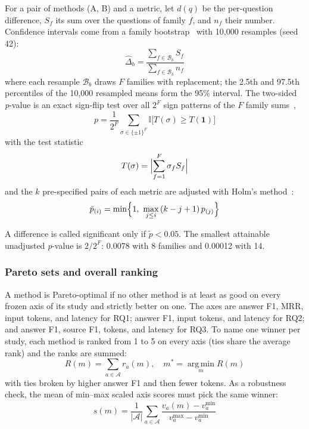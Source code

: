 \documentclass[conference]{IEEEtran}
\begin{document}
For a pair of methods (A, B) and a metric, let $d(q)$ be the per-question difference, $S_f$ its sum over the questions of family $f$, and $n_f$ their number. Confidence intervals come from a family bootstrap~\cite{efron1993,cameron2008} with 10,000 resamples (seed 42):
\begin{equation}
\hat{\Delta}_b=\frac{\sum_{f\in\mathcal{B}_b} S_f}{\sum_{f\in\mathcal{B}_b} n_f}
\label{eq:boot}
\end{equation}
where each resample $\mathcal{B}_b$ draws $F$ families with replacement; the 2.5th and 97.5th percentiles of the 10,000 resampled means form the 95\% interval. The two-sided \emph{p}-value is an exact sign-flip test over all $2^F$ sign patterns of the $F$ family sums~\cite{good2005},
\begin{equation}
p=\frac{1}{2^F}\sum_{\sigma\in\{\pm1\}^F}\mathbb{I}\bigl[T(\sigma)\ge T(\mathbf{1})\bigr]
\label{eq:signflip}
\end{equation}
with the test statistic
\begin{equation}
T(\sigma)=\Bigl|\sum_{f=1}^{F}\sigma_f S_f\Bigr|
\label{eq:tstat}
\end{equation}
and the $k$ pre-specified pairs of each metric are adjusted with Holm's method~\cite{holm1979}:
\begin{equation}
\tilde{p}_{(i)}=\min\Bigl\{1,\ \max_{j\le i}\,(k-j+1)\,p_{(j)}\Bigr\}
\label{eq:holm}
\end{equation}

A difference is called significant only if $\tilde{p}<0.05$. The smallest attainable unadjusted \emph{p}-value is $2/2^F$: 0.0078 with 8 families and 0.00012 with 14.

\subsubsection{Pareto sets and overall ranking}

A method is Pareto-optimal if no other method is at least as good on every frozen axis of its study and strictly better on one. The axes are answer F1, MRR, input tokens, and latency for RQ1; answer F1, input tokens, and latency for RQ2; and answer F1, source F1, tokens, and latency for RQ3. To name one winner per study, each method is ranked from 1 to 5 on every axis (ties share the average rank) and the ranks are summed:
\begin{equation}
R(m)=\sum_{a\in\mathcal{A}} r_a(m),\quad m^*=\operatorname*{arg\,min}_{m} R(m)
\label{eq:rank}
\end{equation}
with ties broken by higher answer F1 and then fewer tokens. As a robustness check, the mean of min--max scaled axis scores must pick the same winner:
\begin{equation}
s(m)=\frac{1}{|\mathcal{A}|}\sum_{a\in\mathcal{A}}\frac{v_a(m)-v_a^{\min}}{v_a^{\max}-v_a^{\min}}
\label{eq:scaled}
\end{equation}
\end{document}

